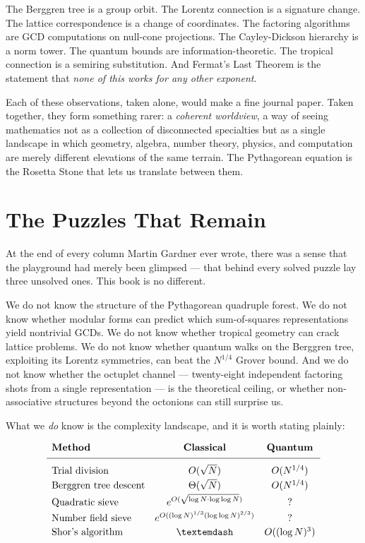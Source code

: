 The Berggren tree is a group orbit. The Lorentz connection is a signature change. The lattice correspondence is a change of coordinates. The factoring algorithms are GCD computations on null-cone projections. The Cayley-Dickson hierarchy is a norm tower. The quantum bounds are information-theoretic. The tropical connection is a semiring substitution. And Fermat's Last Theorem is the statement that \textit{none of this works for any other exponent}.

Each of these observations, taken alone, would make a fine journal paper. Taken together, they form something rarer: a \textit{coherent worldview}, a way of seeing mathematics not as a collection of disconnected specialties but as a single landscape in which geometry, algebra, number theory, physics, and computation are merely different elevations of the same terrain. The Pythagorean equation is the Rosetta Stone that lets us translate between them.


\ornbreak



\section{The Puzzles That Remain}


At the end of every column Martin Gardner ever wrote, there was a sense that the playground had merely been glimpsed --- that behind every solved puzzle lay three unsolved ones. This book is no different.

We do not know the structure of the Pythagorean quadruple forest. We do not know whether modular forms can predict which sum-of-squares representations yield nontrivial GCDs. We do not know whether tropical geometry can crack lattice problems. We do not know whether quantum walks on the Berggren tree, exploiting its Lorentz symmetries, can beat the $N^{1/4}$ Grover bound. And we do not know whether the octuplet channel --- twenty-eight independent factoring shots from a single representation --- is the theoretical ceiling, or whether non-associative structures beyond the octonions can still surprise us.

What we \textit{do} know is the complexity landscape, and it is worth stating plainly:

\[
\begin{array}{lcc}
\textbf{Method} & \textbf{Classical} & \textbf{Quantum} \\[4pt]
\hline
\\[-6pt]
\text{Trial division} & O(\sqrt{N}) & O(N^{1/4}) \\[2pt]
\text{Berggren tree descent} & \Theta(\sqrt{N}) & O(N^{1/4}) \\[2pt]
\text{Quadratic sieve} & e^{O(\sqrt{\log N \cdot \log\log N})} & ? \\[2pt]
\text{Number field sieve} & e^{O((\log N)^{1/3}(\log\log N)^{2/3})} & ? \\[2pt]
\text{Shor's algorithm} & — & O((\log N)^3) \\[2pt]
\end{array}
\]

